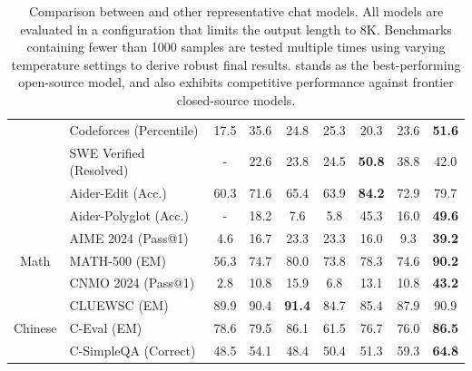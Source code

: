 \begin{table}[h]
\begin{tabular}{@{}c l | c  c | c c c c| c@{}}
    & Codeforces {\tiny (Percentile)} & 17.5 & 35.6 & 24.8 & 25.3 & 20.3 & 23.6 & \textbf{51.6} \\
    & SWE Verified {\tiny (Resolved)} &-&22.6& 23.8 & 24.5 & \textbf{50.8}&38.8&42.0\\
    & Aider-Edit {\tiny (Acc.)} & 60.3& 71.6 & 65.4 & 63.9 & \textbf{84.2} &72.9&79.7 \\
    & Aider-Polyglot {\tiny (Acc.)}  & -& 18.2 & 7.6 & 5.8 & 45.3&16.0&\textbf{49.6} \\
    \midrule
    \multirow{3}{*}{Math} & AIME 2024 {\tiny (Pass@1)} & 4.6 & 16.7 & 23.3 & 23.3 & 16.0 & 9.3 & \textbf{39.2} \\
    & MATH-500 {\tiny (EM)} &  56.3 & 74.7 & 80.0 & 73.8 & 78.3 & 74.6&\textbf{90.2} \\
    & CNMO 2024 {\tiny (Pass@1)} & 2.8 & 10.8 & 15.9& 6.8& 13.1 & 10.8 &\textbf{43.2} \\
    \midrule
    \multirow{3}{*}{Chinese} & CLUEWSC {\tiny (EM)} & 89.9& 90.4 & \textbf{91.4} & 84.7 & 85.4 & 87.9 & 90.9\\
    & C-Eval {\tiny (EM)} & 78.6& 79.5 & 86.1 & 61.5 & 76.7 & 76.0 & \textbf{86.5}\\
     & C-SimpleQA {\tiny (Correct)}  & 48.5& 54.1 & 48.4 & 50.4 & 51.3 & 59.3 & \textbf{64.8}\\
    \bottomrule
    \end{tabular}
    \caption{
        Comparison between \dsviii{} and other representative chat models. 
        All models are evaluated in a configuration that limits the output length to 8K.
        Benchmarks containing fewer than 1000 samples are tested multiple times using varying temperature settings to derive robust final results.
        \dsviii{} stands as the best-performing open-source model, and also exhibits competitive performance against frontier closed-source models. 
    }
    \label{tab:chat}
\end{table}
